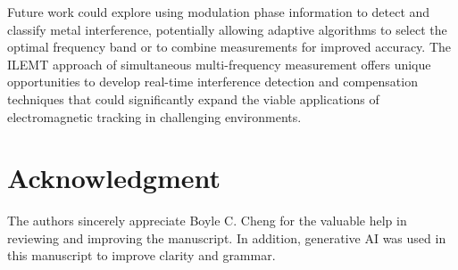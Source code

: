\documentclass[journal,twoside,web]{ieeecolor}
\begin{document}
Future work could explore using modulation phase information to detect and classify metal interference, potentially allowing adaptive algorithms to select the optimal frequency band or to combine measurements for improved accuracy. The ILEMT approach of simultaneous multi-frequency measurement offers unique opportunities to develop real-time interference detection and compensation techniques that could significantly expand the viable applications of electromagnetic tracking in challenging environments.

\section*{Acknowledgment}
The authors sincerely appreciate Boyle C. Cheng for the valuable help in reviewing and improving the manuscript. In addition, generative AI was used in this manuscript to improve clarity and grammar.



\end{document}
